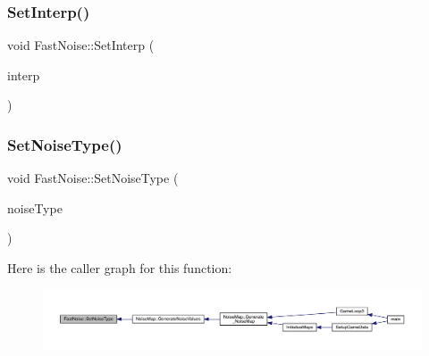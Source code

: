 \mbox{\label{class_fast_noise_a5db11de37bebf7a99f6788a9ae9d7bf9}} 
\subsubsection{\texorpdfstring{Set\+Interp()}{SetInterp()}}
{\footnotesize\ttfamily void Fast\+Noise\+::\+Set\+Interp (\begin{DoxyParamCaption}\item[{\mbox{\hyperlink{class_fast_noise_a60969f626ea3ea3504ea51d789f19a33}{Interp}}}]{interp }\end{DoxyParamCaption})\hspace{0.3cm}{\ttfamily [inline]}}

\mbox{\label{class_fast_noise_ae6cb2170c036bde4bc56ad7d0303e4bb}} 
\subsubsection{\texorpdfstring{Set\+Noise\+Type()}{SetNoiseType()}}
{\footnotesize\ttfamily void Fast\+Noise\+::\+Set\+Noise\+Type (\begin{DoxyParamCaption}\item[{\mbox{\hyperlink{class_fast_noise_a77adcfdc4d6e9410ef6099553509d09f}{Noise\+Type}}}]{noise\+Type }\end{DoxyParamCaption})\hspace{0.3cm}{\ttfamily [inline]}}

Here is the caller graph for this function\+:
\nopagebreak
\begin{figure}[H]
\begin{center}
\leavevmode
\includegraphics[width=350pt]{d1/dd8/class_fast_noise_ae6cb2170c036bde4bc56ad7d0303e4bb_icgraph}
\end{center}
\end{figure}
\mbox{\label{class_fast_noise_a2efb595ec8bc18541a3739c6bd9b7567}} 

